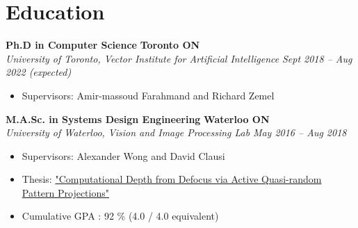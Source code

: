 \section*{Education}
\vspace{\postsubhead}
    \textbf{Ph.D in Computer Science}
    \hfill
    \textbf{Toronto ON}\\
    \textit{University of Toronto, Vector Institute for Artificial Intelligence}
    \hfill
    \textit{Sept 2018 -- Aug 2022 (expected)}
    \begin{itemize}
        \item Supervisors: Amir-massoud Farahmand and Richard Zemel
    \end{itemize}
    \vspace{\interlist}
    
    \textbf{M.A.Sc. in Systems Design Engineering}
    \hfill
    \textbf{Waterloo ON}\\
    \textit{University of Waterloo, Vision and Image Processing Lab}
    \hfill
    \textit{May 2016 -- Aug 2018}
    \begin{itemize}
        \item Supervisors: Alexander Wong and David Clausi
        \item Thesis: \href{https://uwspace.uwaterloo.ca/handle/10012/13645}{"Computational Depth from Defocus via Active Quasi-random Pattern Projections"}
        \item Cumulative GPA : 92 \% (4.0 / 4.0 equivalent) 
    \end{itemize}
    \vspace{\interlist}

